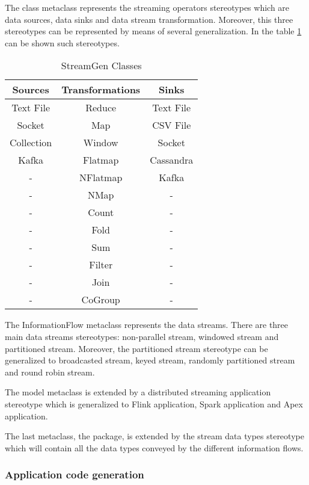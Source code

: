 The class metaclass represents the streaming operators stereotypes which are data sources, data sinks and data stream transformation. Moreover, this three stereotypes can be represented by means of several generalization. In the table \ref{StreamGen Classes} can be shown such stereotypes.

\begin{table}[h!]
\centering
	\begin{tabular}{||c|c|c||} 
	\hline\hline
	Sources & Transformations & Sinks \\ 
	\hline\hline
	Text File & Reduce & Text File \\ 
	\hline
	Socket & Map & CSV File \\ 
	\hline
	Collection & Window & Socket \\ 
	\hline
	Kafka & Flatmap & Cassandra \\ 
	\hline
	 - & NFlatmap & Kafka \\
	\hline
	 - & NMap & - \\
	\hline
	 - & Count & - \\
	\hline
	 - & Fold & - \\
	\hline
	 - & Sum & - \\
	\hline
	 - & Filter & - \\
	\hline
	 - & Join & - \\
	\hline
	 - & CoGroup & - \\
	\hline\hline
	\end{tabular}
\caption{StreamGen Classes}
\label{StreamGen Classes}
\end{table}

The InformationFlow metaclass represents the data streams. There are three main data streams stereotypes: non-parallel stream, windowed stream and partitioned stream. Moreover, the partitioned stream stereotype can be generalized to broadcasted stream, keyed stream, randomly partitioned stream and round robin stream.

The model metaclass is extended by a distributed streaming application stereotype which is generalized to Flink application, Spark application and Apex application.

The last metaclass, the package, is extended by the stream data types stereotype which will contain all the data types conveyed by the different information flows.

\subsubsection*{Application code generation}

